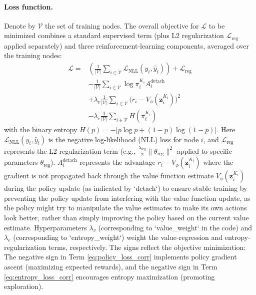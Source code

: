 \documentclass{gdl}
\begin{document}
\paragraph{Loss function.}
Denote by $\mathcal{V}$ the set of training nodes. The overall objective for $\mathcal{L}$ to be minimized combines a standard supervised term (plus L2 regularization $\mathcal{L}_{\text{reg}}$ applied separately) and three reinforcement-learning components, averaged over the training nodes:
\begin{align}
\mathcal{L} = &\left( \frac{1}{|\mathcal{V}|} \sum_{i\in\mathcal{V}} \mathcal{L}_{\text{NLL}}(y_i, \hat{y}_i) \right) + \mathcal{L}_{\text{reg}} \label{eq:supervised_loss_corr}\\
 &- \frac{1}{|\mathcal{V}|} \sum_{i\in\mathcal{V}} \log\pi_{i}^{K_i} A_i^{\text{detach}} \label{eq:policy_loss_corr}\\
 &+ \lambda_v \frac{1}{|\mathcal{V}|} \sum_{i\in\mathcal{V}} \bigl(r_i - V_{\phi}(\mathbf{z}_i^{K_i})\bigr)^2 \label{eq:value_loss_corr}\\
 &- \lambda_e \frac{1}{|\mathcal{V}|} \sum_{i\in\mathcal{V}} H(\pi_i^{K_i}) \label{eq:entropy_loss_corr}
\end{align}
with the binary entropy $H(p)= -\bigl[p\log p + (1-p)\log(1-p)\bigr]$. Here $\mathcal{L}_{\text{NLL}}(y_i, \hat{y}_i)$ is the negative log-likelihood (NLL) loss for node $i$, and $\mathcal{L}_{\text{reg}}$ represents the L2 regularization term (e.g., $\frac{\lambda_{\text{reg}}}{2} \lVert\theta_{\text{reg}}\rVert^2$ applied to specific parameters $\theta_{\text{reg}}$). $A_i^{\text{detach}}$ represents the advantage $r_i - V_{\phi}(\mathbf{z}_i^{K_i})$ where the gradient is not propagated back through the value function estimate $V_{\phi}(\mathbf{z}_i^{K_i})$ during the policy update (as indicated by `detach`) to ensure stable training by preventing the policy update from interfering with the value function update, as the policy might try to manipulate the value estimates to make its own actions look better, rather than simply improving the policy based on the current value estimate. Hyperparameters $\lambda_v$ (corresponding to `value\_weight` in the code) and $\lambda_e$ (corresponding to `entropy\_weight`) weight the value-regression and entropy-regularization terms, respectively. The signs reflect the objective minimization: The negative sign in Term \ref{eq:policy_loss_corr} implements policy gradient ascent (maximizing expected rewards), and the negative sign in Term \ref{eq:entropy_loss_corr} encourages entropy maximization (promoting exploration).
    
\end{document}
